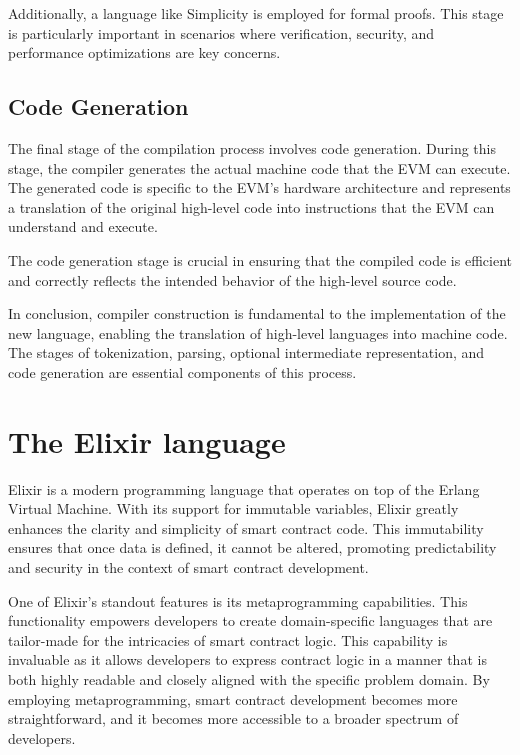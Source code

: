 Additionally, a language like Simplicity is employed for formal proofs. This stage is particularly important in scenarios where verification, security, and performance optimizations are key concerns.

\subsection{Code Generation}

The final stage of the compilation process involves code generation. During this stage, the compiler generates the actual machine code that the EVM can execute. The generated code is specific to the EVM's hardware architecture and represents a translation of the original high-level code into instructions that the EVM can understand and execute.

The code generation stage is crucial in ensuring that the compiled code is efficient and correctly reflects the intended behavior of the high-level source code.


In conclusion, compiler construction is fundamental to the implementation of the new language, enabling the translation of high-level languages into machine code. The stages of tokenization, parsing, optional intermediate representation, and code generation are essential components of this process.

\section{The Elixir language}
\label{sec:ex}

Elixir is a modern programming language that operates on top of the Erlang Virtual Machine. With its support for immutable variables, Elixir greatly enhances the clarity and simplicity of smart contract code. This immutability ensures that once data is defined, it cannot be altered, promoting predictability and security in the context of smart contract development.

One of Elixir's standout features is its metaprogramming capabilities. This functionality empowers developers to create domain-specific languages that are tailor-made for the intricacies of smart contract logic. This capability is invaluable as it allows developers to express contract logic in a manner that is both highly readable and closely aligned with the specific problem domain. By employing metaprogramming, smart contract development becomes more straightforward, and it becomes more accessible to a broader spectrum of developers.

